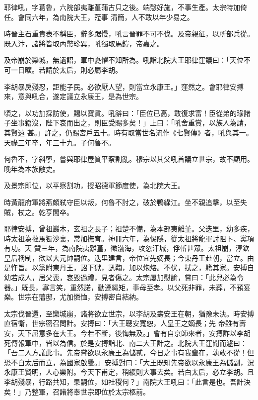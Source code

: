 \begin{pinyinscope}
 耶律吼，字葛魯，六院部夷離堇蒲古只之後。端愨好施，不事生產。太宗特加倚任。會同六年，為南院大王，蒞事
 清簡，人不敢以年少易之。



 時晉主石重貴表不稱臣，辭多踞慢，吼言晉罪不可不伐。及帝親征，以所部兵從。既入汴，諸將皆取內幣珍異，吼獨取馬鎧，帝嘉之。



 及帝崩於欒城，無遺詔，軍中憂懼不知所為。吼詣北院大王耶律窪議曰：「天位不可一日曠。若請於太后，則必屬李胡。



 李胡暴戾殘忍，詎能子民。必欲厭人望，則當立永康王。」窪然之。會耶律安搏來，意與吼合，遂定議立永康王，是為世宗。



 頃之，以功加採訪使，賜以寶貨。吼辭曰：「臣位已高，敢復求富！臣從弟的琭諸子坐事籍沒，陛下哀而出之，則臣受賜多矣！」上曰：「吼舍重賞，以族人為請，其賢遠
 甚。」許之，仍賜宮戶五十。時有取當世名流作《七賢傳》者，吼與其一。天祿三年卒，年三十九。子何魯不。



 何魯不，字斜寧，嘗與耶律屋質平察割亂。穆宗以其父吼首議立世宗，故不顯用。晚年為本族敞史。



 及景宗即位，以平察割功，授昭德軍節度使，為北院大王。



 時黃龍府軍將燕頗弒守臣以叛，何魯不討之，破於鴨綠江。坐不親追擊，以至失賊，杖之。乾亨間卒。



 耶律安搏，曾祖巖木，玄祖之長子；祖楚不備，為本部夷離堇。父迭里，幼多疾，時太祖為撻馬獨沙裏，常加撫育。神冊六年，為惕隱，從太祖將龍軍討阻卜、黨項有功。天
 贊三年，為南院夷離堇，徵渤海，攻忽汗城，俘斬甚眾。太祖崩，淳欽皇后稱制，欲以大元帥嗣位。迭里建言，帝位宜先嫡長；今東丹王赴朝，當立。由是忤旨。以黨附東丹王，詔下獄，訊鞫，加以炮烙。不伏，拭之，籍其家。安搏自幼若成人，居父喪，哀毀過禮，見者傷之。太宗屢加慰諭，嘗曰：「此兒必為令器。」既長，寡言笑，重然諾，動遵繩矩，事母至孝。以父死非罪，未葬，不預宴樂。世宗在藩邸，尤加憐恤，安搏密自結納。



 太宗伐晉還，至欒城崩，諸將欲立世宗，以李胡及壽安王在朝，猶豫未決。時安搏直宿衛，世宗密召問計。安搏曰：「大王聰安寬恕，人皇王之嫡長；先
 帝雖有壽安，天下屈意多在大王。今若不斷，後悔無及。」會有自京師來者，安搏詐以李胡死傳報軍中，皆以為信。於是安搏詣北、南二大王計之。北院大王窪聞而遽曰：「吾二人方議此事。先帝嘗欲以永康王為儲貳，今日之事有我輩在，孰敢不從！但恐不白太后而立，為國家啟釁。」安搏對曰：「大王既知先帝欲以永康王為儲副，況永康王賢明，人心樂附。今天下甫定，稍緩則大事去矣。若白太后，必立李胡。且李胡殘暴，行路共知，果嗣位，如社稷何？」南院大王吼曰：「此言是也。吾計決矣！」乃整軍，召諸將奉世宗即位於太宗柩前。




\end{pinyinscope}

